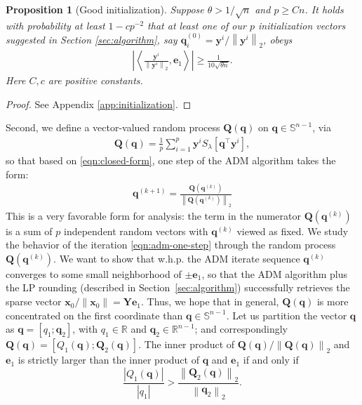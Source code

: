 \documentclass[11pt, journal, final]{IEEEtran}
\numberwithin{equation}{section}
\newtheorem{proposition}[theorem]{Proposition}
\newcommand{\reals}{\bb R}
\newcommand{\mb}{\mathbf}
\newcommand{\bb}{\mathbb}
\newcommand{\norm}[1]{\left\lVert#1\right\rVert}
\newcommand{ \abs }[1]{\left| #1 \right|}
\newcommand{ \brac }[1]{\left[ #1 \right]}
\newcommand{ \paren }[1]{ \left( #1 \right) }
\newcommand{\innerprod}[2]{\left\langle #1,  #2 \right\rangle}
\begin{document}
{\begin{proposition}[Good initialization]\label{prop:initialization}
Suppose $\theta > 1/\sqrt{n}$ and $ p \ge Cn$. It holds with probability at least $1 -cp^{-2}$ that at least one of our $p$ initialization vectors suggested in Section \ref{sec:algorithm}, say $\mb q_i^{(0)} = \mb y^i /\norm{\mb y^i}_2$, obeys
\begin{align}
\abs{\innerprod{\frac{\mb y^i}{\norm{\mb y^i}_2}}{\mb e_1}} \ge \frac{1}{10\sqrt{\theta n}}.
\end{align}
Here $C, c$ are positive constants.
\end{proposition}
\begin{proof}
	See Appendix \ref{app:initialization}.
\end{proof}
Second, we define a vector-valued random process $\mb Q(\mb q)$ on $\mb q\in \bb S^{n-1}$, via
\begin{align}\label{eqn:Q-process}
	\mb Q(\mb q) = \frac{1}{p} \sum_{i=1}^p {\mb y}^i S_\lambda\brac{  \mb q^\top {\mb y}^i  },
\end{align}
so that based on \eqref{eqn:closed-form}, one step of the ADM algorithm takes the form:
\begin{align}\label{eqn:adm-one-step}
	\mb q^{(k+1)} = \frac{\mb Q\paren{\mb q^{(k)} }}{ \norm{\mb Q\paren{\mb q^{(k)} } }_2}
\end{align}
This is a very favorable form for analysis: the term in the numerator $\mb Q\paren{\mb q^{(k)} }$ is a sum of $p$ independent random vectors with $\mb q^{(k)}$ viewed as fixed. We study the behavior of the iteration \eqref{eqn:adm-one-step} through the random process $\mb Q\paren{\mb q^{(k)} }$. We want to show that w.h.p. the ADM iterate sequence $\mb q^{(k)}$ converges to some small neighborhood of $\pm \mb e_1$, so that the ADM algorithm plus the LP rounding (described in Section~\ref{sec:algorithm}) successfully retrieves the sparse vector $\mb x_0/\|\mb x_0\| = \mb Y \mb e_1$. Thus, we hope that in general, $\mb Q(\mb q)$ is more concentrated on the first coordinate than $\mb q\in \bb S^{n-1}$. Let us partition the vector $\mb q$ as $\mb q = [q_1; \mb q_2]$, with $q_1 \in \reals$ and $\mb q_2 \in \reals^{n-1}$; and correspondingly $\mb Q(\mb q) = [Q_1(\mb q); \mb Q_2(\mb q)]$. The inner product of $\mb Q(\mb q) / \norm{\mb Q(\mb q)}_2$ and $\mb e_1$ is strictly larger than the inner product of $\mb q$ and $\mb e_1$ if and only if
\begin{equation*}
\frac{ \abs{ Q_1(\mb q) }}{ \abs{q_1} } > \frac{ \norm{\mb Q_2(\mb q) }_{2} }{ \norm{\mb q_2}_{2} }.

\end{equation*}}
\end{document}
